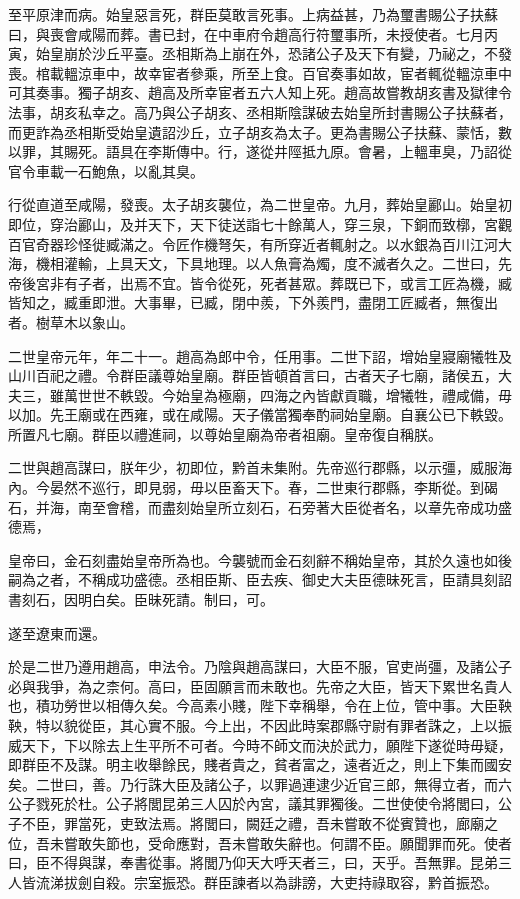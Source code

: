 至平原津而病。始皇惡言死，群臣莫敢言死事。上病益甚，乃為璽書賜公子扶蘇曰，與喪會咸陽而葬。書已封，在中車府令趙高行符璽事所，未授使者。七月丙寅，始皇崩於沙丘平臺。丞相斯為上崩在外，恐諸公子及天下有變，乃祕之，不發喪。棺載轀涼車中，故幸宦者參乘，所至上食。百官奏事如故，宦者輒從轀涼車中可其奏事。獨子胡亥、趙高及所幸宦者五六人知上死。趙高故嘗教胡亥書及獄律令法事，胡亥私幸之。高乃與公子胡亥、丞相斯陰謀破去始皇所封書賜公子扶蘇者，而更詐為丞相斯受始皇遺詔沙丘，立子胡亥為太子。更為書賜公子扶蘇、蒙恬，數以罪，其賜死。語具在李斯傳中。行，遂從井陘抵九原。會暑，上轀車臭，乃詔從官令車載一石鮑魚，以亂其臭。

行從直道至咸陽，發喪。太子胡亥襲位，為二世皇帝。九月，葬始皇酈山。始皇初即位，穿治酈山，及并天下，天下徒送詣七十餘萬人，穿三泉，下銅而致槨，宮觀百官奇器珍怪徙臧滿之。令匠作機弩矢，有所穿近者輒射之。以水銀為百川江河大海，機相灌輸，上具天文，下具地理。以人魚膏為燭，度不滅者久之。二世曰，先帝後宮非有子者，出焉不宜。皆令從死，死者甚眾。葬既已下，或言工匠為機，臧皆知之，臧重即泄。大事畢，已臧，閉中羨，下外羨門，盡閉工匠臧者，無復出者。樹草木以象山。

二世皇帝元年，年二十一。趙高為郎中令，任用事。二世下詔，增始皇寢廟犧牲及山川百祀之禮。令群臣議尊始皇廟。群臣皆頓首言曰，古者天子七廟，諸侯五，大夫三，雖萬世世不軼毀。今始皇為極廟，四海之內皆獻貢職，增犧牲，禮咸備，毋以加。先王廟或在西雍，或在咸陽。天子儀當獨奉酌祠始皇廟。自襄公已下軼毀。所置凡七廟。群臣以禮進祠，以尊始皇廟為帝者祖廟。皇帝復自稱朕。

二世與趙高謀曰，朕年少，初即位，黔首未集附。先帝巡行郡縣，以示彊，威服海內。今晏然不巡行，即見弱，毋以臣畜天下。春，二世東行郡縣，李斯從。到碣石，并海，南至會稽，而盡刻始皇所立刻石，石旁著大臣從者名，以章先帝成功盛德焉，

皇帝曰，金石刻盡始皇帝所為也。今襲號而金石刻辭不稱始皇帝，其於久遠也如後嗣為之者，不稱成功盛德。丞相臣斯、臣去疾、御史大夫臣德昧死言，臣請具刻詔書刻石，因明白矣。臣昧死請。制曰，可。

遂至遼東而還。

於是二世乃遵用趙高，申法令。乃陰與趙高謀曰，大臣不服，官吏尚彊，及諸公子必與我爭，為之柰何。高曰，臣固願言而未敢也。先帝之大臣，皆天下累世名貴人也，積功勞世以相傳久矣。今高素小賤，陛下幸稱舉，令在上位，管中事。大臣鞅鞅，特以貌從臣，其心實不服。今上出，不因此時案郡縣守尉有罪者誅之，上以振威天下，下以除去上生平所不可者。今時不師文而決於武力，願陛下遂從時毋疑，即群臣不及謀。明主收舉餘民，賤者貴之，貧者富之，遠者近之，則上下集而國安矣。二世曰，善。乃行誅大臣及諸公子，以罪過連逮少近官三郎，無得立者，而六公子戮死於杜。公子將閭昆弟三人囚於內宮，議其罪獨後。二世使使令將閭曰，公子不臣，罪當死，吏致法焉。將閭曰，闕廷之禮，吾未嘗敢不從賓贊也，廊廟之位，吾未嘗敢失節也，受命應對，吾未嘗敢失辭也。何謂不臣。願聞罪而死。使者曰，臣不得與謀，奉書從事。將閭乃仰天大呼天者三，曰，天乎。吾無罪。昆弟三人皆流涕拔劍自殺。宗室振恐。群臣諫者以為誹謗，大吏持祿取容，黔首振恐。

